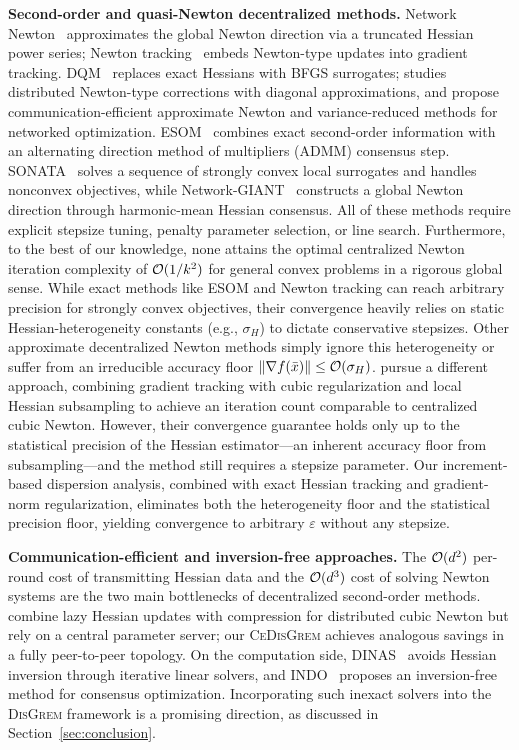 \documentclass[review,onefignum,onetabnum]{siamart171218}
\begin{document}
	\noindent\textbf{Second-order and quasi-Newton decentralized methods.}
	Network Newton~\citep{mokhtari2017networknewton} approximates
	the global Newton direction via a truncated Hessian power series;
	Newton tracking~\citep{zhang2021newtontracking} embeds Newton-type
	updates into gradient tracking.
	DQM~\citep{eisen2017dqn} replaces exact Hessians with BFGS
	surrogates; \citet{bajovic2017newton} studies distributed
	Newton-type corrections with diagonal approximations, and
	\citet{li2020communication} propose communication-efficient
	approximate Newton and variance-reduced methods for networked optimization.
	ESOM~\citep{mokhtari2016esom} combines exact second-order information
	with an alternating direction method of multipliers (ADMM) consensus step.
	SONATA~\citep{sun2022sonata} solves a sequence of strongly convex
	local surrogates and handles nonconvex objectives, while
	Network-GIANT~\citep{maritan2023networkgiant} constructs a global Newton
	direction through harmonic-mean Hessian consensus.
	All of these methods require explicit stepsize tuning, penalty
	parameter selection, or line search.
	Furthermore, to the best of our knowledge, none attains the optimal
	centralized Newton iteration complexity of $\mathcal{O}(1/k^2)$ for general
	convex problems in a rigorous global sense.
	While exact methods like ESOM and Newton tracking can reach
	arbitrary precision for strongly convex objectives, their
	convergence heavily relies on static Hessian-heterogeneity
	constants (e.g., $\sigma_H$) to dictate conservative stepsizes.
	Other approximate decentralized Newton methods simply ignore this
	heterogeneity or suffer from an irreducible accuracy floor
	$\|\nabla f(\bar x)\|\le\mathcal{O}(\sigma_H)$.
	\citet{daneshmand2021newton} pursue a different approach, combining
	gradient tracking with cubic regularization and local Hessian
	subsampling to achieve an iteration count comparable to centralized
	cubic Newton.
	However, their convergence guarantee holds only up to the statistical
	precision of the Hessian estimator---an inherent accuracy floor from
	subsampling---and the method still requires a stepsize parameter.
	Our increment-based dispersion analysis, combined with
	exact Hessian tracking and gradient-norm regularization, eliminates
	both the heterogeneity floor and the statistical precision floor,
	yielding convergence to arbitrary $\varepsilon$ without any stepsize.
	
	\noindent\textbf{Communication-efficient and inversion-free approaches.}
	The $\mathcal{O}(d^2)$ per-round cost of transmitting Hessian data and
	the $\mathcal{O}(d^3)$ cost of solving Newton systems are the two main
	bottlenecks of decentralized second-order methods.
	\citet{zhang2024cubic} combine lazy Hessian updates with
	compression for distributed cubic Newton but rely on a central
	parameter server; our \textsc{CeDisGrem} achieves analogous
	savings in a fully peer-to-peer topology.
	On the computation side, DINAS~\citep{jakovetic2025dinas} avoids
	Hessian inversion through iterative linear solvers, and
	INDO~\citep{yuan2023indo} proposes an inversion-free method for
	consensus optimization.
	Incorporating such inexact solvers into the \textsc{DisGrem}
	framework is a promising direction, as discussed in
	Section~\ref{sec:conclusion}.
	
\end{document}
